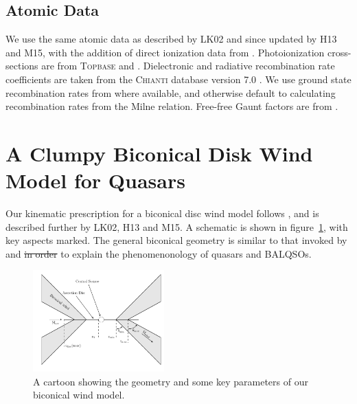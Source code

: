\documentclass[preprint, a4paper, 11pt]{aastex}
\providecommand{\DIFdel}[1]{{\protect\color{red}\sout{#1}}}                      %
\providecommand{\DIFdelbegin}{} %
\providecommand{\DIFdelend}{} %
\begin{document}


\subsection{Atomic Data}

We use the same atomic data as described by LK02 and since updated by H13 and M15, 
with the addition of direct ionization data from \cite{dere2007}. 
Photoionization cross-sections are from \textsc{Topbase} \citep{cunto1993} and  \cite{vfky}.
Dielectronic and radiative recombination rate coefficients are taken from 
the \textsc{Chianti} database version 7.0 \citep{dere1997,landi2012}.
We use ground state recombination rates from \cite{badnell2006} where available,
and otherwise default to calculating recombination rates from the Milne
relation. Free-free Gaunt factors are from \cite{sutherland1998}.





\DIFdelbegin %

\DIFdelend %
\DIFdelbegin %

\DIFdelend %

\section{A Clumpy Biconical Disk Wind Model for Quasars}

Our kinematic prescription for a biconical disc wind model
follows \cite{SV93}, and is described further by
LK02, H13 and M15. A schematic is shown in figure~\ref{fig:cartoon},
with key aspects marked. The general biconical
geometry is similar to that invoked by \cite{MCGV95} and 
\cite{elvis2000} \DIFdelbegin \DIFdel{in order }\DIFdelend to explain the phenomenonology
of quasars and BALQSOs.

\begin{figure} 
\centering
\includegraphics[width=0.45\textwidth]{figures/fig2_cartoon.png}
\caption
{
A cartoon showing the geometry and some key parameters of
our biconical wind model.
}
\label{fig:cartoon}
\end{figure} 
\end{document}
